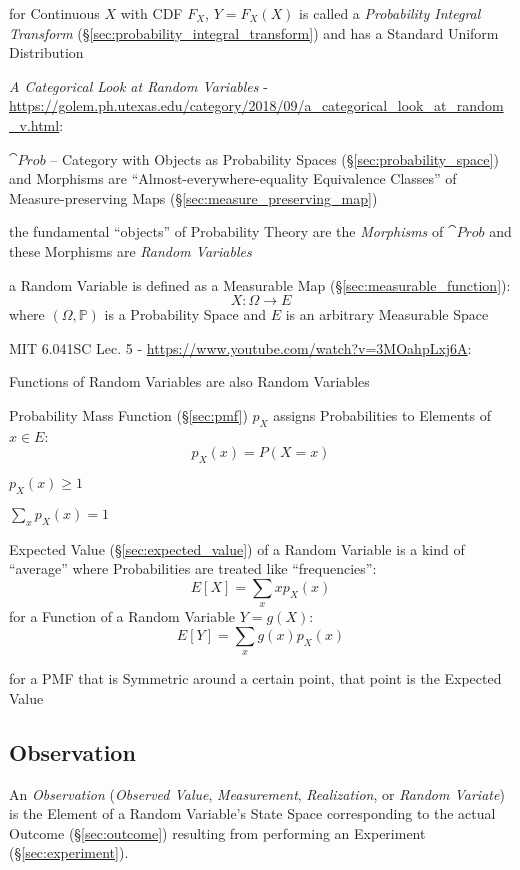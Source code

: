 for Continuous $X$ with CDF $F_X$, $Y = F_X(X)$ is called a \emph{Probability
  Integral Transform} (\S\ref{sec:probability_integral_transform}) and has a
Standard Uniform Distribution

\asterism

\emph{A Categorical Look at Random Variables} -
\url{https://golem.ph.utexas.edu/category/2018/09/a_categorical_look_at_random_v.html}:

$\cat{Prob}$ -- Category with Objects as Probability Spaces
(\S\ref{sec:probability_space}) and Morphisms are ``Almost-everywhere-equality
Equivalence Classes'' of Measure-preserving Maps
(\S\ref{sec:measure_preserving_map})

the fundamental ``objects'' of Probability Theory are the \emph{Morphisms} of
$\cat{Prob}$ and these Morphisms are \emph{Random Variables}

a Random Variable is defined as a Measurable Map
(\S\ref{sec:measurable_function}):
\[
  X : \Omega \rightarrow E
\]
where $(\Omega,\mathbb{P})$ is a Probability Space and $E$ is an arbitrary
Measurable Space

\asterism

MIT 6.041SC Lec. 5 - \url{https://www.youtube.com/watch?v=3MOahpLxj6A}:

Functions of Random Variables are also Random Variables

Probability Mass Function (\S\ref{sec:pmf}) $p_X$ assigns
Probabilities to Elements of $x \in E$:
\[
  p_X(x) = P(X = x)
\]

$p_X(x) \geq 1$

$\sum_x p_X(x) = 1$

Expected Value (\S\ref{sec:expected_value}) of a Random Variable is a kind of
``average'' where Probabilities are treated like ``frequencies'':
\[
  E[X] = \sum_x xp_X(x)
\]
for a Function of a Random Variable $Y = g(X)$:
\[
  E[Y] = \sum_x g(x)p_X(x)
\]

for a PMF that is Symmetric around a certain point, that point is the Expected
Value



\subsection{Observation}\label{sec:observation}

An \emph{Observation} (\emph{Observed Value}, \emph{Measurement},
\emph{Realization}, or \emph{Random Variate}) is the Element of a Random
Variable's State Space corresponding to the actual Outcome (\S\ref{sec:outcome})
resulting from performing an Experiment (\S\ref{sec:experiment}).

